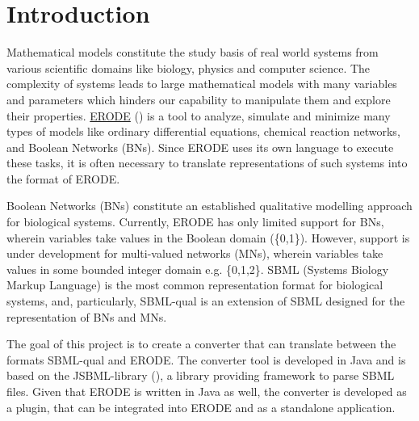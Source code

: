 \chapter{Introduction}

Mathematical models constitute the study basis of real world systems from various scientific domains like biology, physics and computer science. The complexity of systems leads to large mathematical models with many variables and parameters which hinders our capability to manipulate them and explore their properties. \href{https://www.erode.eu/}{ERODE} (\cite{erode}) is a tool to analyze, simulate and minimize 
many types of models like ordinary differential equations, chemical reaction networks, and Boolean Networks (BNs).  Since ERODE uses its own language to execute these tasks, it is often necessary to translate representations of such systems into the format of ERODE.   

Boolean Networks (BNs) constitute an established qualitative
modelling approach for biological systems. Currently, ERODE has only limited support for BNs, wherein variables take values in the Boolean domain (\{0,1\}). However, support is under development for multi-valued networks (MNs), wherein variables take values in some bounded integer domain e.g. \{0,1,2\}. SBML (Systems Biology Markup Language) is the most common representation format for biological systems, and, particularly, SBML-qual is an extension of SBML designed for the representation of BNs and MNs. 

The goal of this project is to create a converter that can translate between the formats SBML-qual and ERODE. The converter tool is developed in Java and is based on the JSBML-library (\cite{sbmlteam_2020}), a library providing framework to parse SBML files. Given that ERODE is written in Java as well, the converter is developed as a plugin, that can be integrated into ERODE and as a standalone application.



